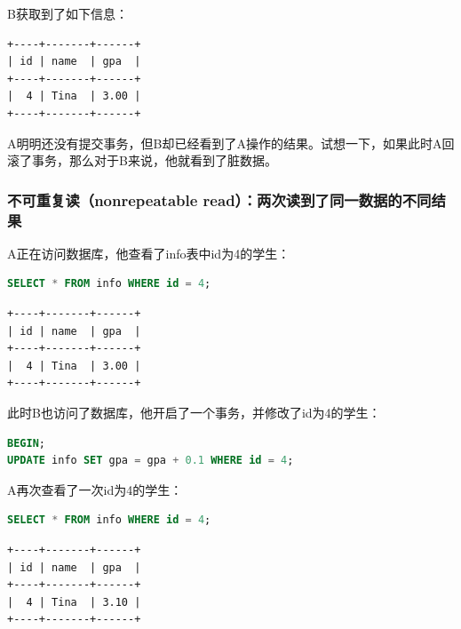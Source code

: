 \documentclass[12pt, openany, oneside]{book}
\begin{document}
B获取到了如下信息：

\begin{tcolorbox}
	\begin{verbatim}
+----+-------+------+
| id | name  | gpa  |
+----+-------+------+
|  4 | Tina  | 3.00 |
+----+-------+------+
	\end{verbatim}
\end{tcolorbox}

A明明还没有提交事务，但B却已经看到了A操作的结果。试想一下，如果此时A回滚了事务，那么对于B来说，他就看到了脏数据。

\subsubsection{不可重复读（nonrepeatable read）：两次读到了同一数据的不同结果}

A正在访问数据库，他查看了info表中id为4的学生：

\vspace{-0.5cm}

\begin{lstlisting}[language=SQL]
SELECT * FROM info WHERE id = 4;
\end{lstlisting}

\begin{tcolorbox}
	\begin{verbatim}
+----+-------+------+
| id | name  | gpa  |
+----+-------+------+
|  4 | Tina  | 3.00 |
+----+-------+------+
	\end{verbatim}
\end{tcolorbox}

此时B也访问了数据库，他开启了一个事务，并修改了id为4的学生：

\vspace{-0.5cm}

\begin{lstlisting}[language=SQL]
BEGIN;
UPDATE info SET gpa = gpa + 0.1 WHERE id = 4;
\end{lstlisting}

A再次查看了一次id为4的学生：

\vspace{-0.5cm}

\begin{lstlisting}[language=SQL]
SELECT * FROM info WHERE id = 4;
\end{lstlisting}

\begin{tcolorbox}
	\begin{verbatim}
+----+-------+------+
| id | name  | gpa  |
+----+-------+------+
|  4 | Tina  | 3.10 |
+----+-------+------+
	\end{verbatim}
\end{tcolorbox}
\end{document}
